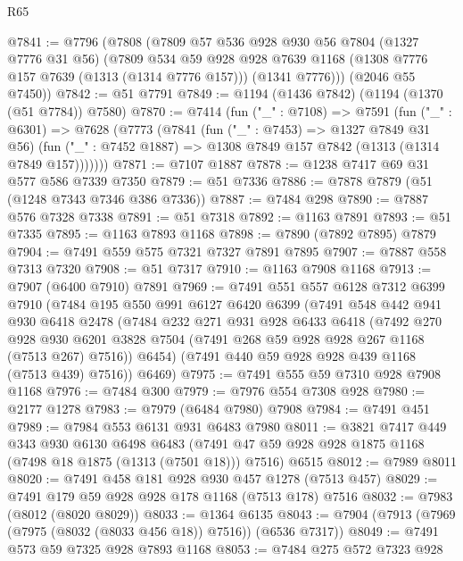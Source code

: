 \begin{lexlean}{R65}
\begin{coremodule}
@7841 := @7796
    (@7808
      (@7809
        @57
        @536
        @928
        @930
        @56
        @7804
        (@1327 @7776 @31 @56)
        (@7809
          @534
          @59
          @928
          @928
          @7639
          @1168
          (@1308 @7776 @157 @7639 (@1313 (@1314 @7776 @157)))
          (@1341 @7776)))
      (@2046 @55 @7450))
@7842 := @51 @7791
@7849 := @1194 (@1436 @7842) (@1194 (@1370 (@51 @7784)) @7580)
@7870 := @7414
    (fun ("_" : @7108) =>
    @7591
      (fun ("_" : @6301) =>
      @7628
        (@7773
          (@7841
            (fun ("_" : @7453) => @1327 @7849 @31 @56)
            (fun ("_" : @7452 @1887) => @1308 @7849 @157 @7842 (@1313 (@1314 @7849 @157)))))))
@7871 := @7107 @1887
@7878 := @1238 @7417 @69 @31 @577 @586 @7339 @7350
@7879 := @51 @7336
@7886 := @7878 @7879 (@51 (@1248 @7343 @7346 @386 @7336))
@7887 := @7484 @298
@7890 := @7887 @576 @7328 @7338
@7891 := @51 @7318
@7892 := @1163 @7891
@7893 := @51 @7335
@7895 := @1163 @7893 @1168
@7898 := @7890 (@7892 @7895) @7879
@7904 := @7491 @559 @575 @7321 @7327 @7891 @7895
@7907 := @7887 @558 @7313 @7320
@7908 := @51 @7317
@7910 := @1163 @7908 @1168
@7913 := @7907 (@6400 @7910) @7891
@7969 := @7491
    @551
    @557
    @6128
    @7312
    @6399
    @7910
    (@7484
      @195
      @550
      @991
      @6127
      @6420
      @6399
      (@7491
        @548
        @442
        @941
        @930
        @6418
        @2478
        (@7484
          @232
          @271
          @931
          @928
          @6433
          @6418
          (@7492
            @270
            @928
            @930
            @6201
            @3828
            @7504
            (@7491 @268 @59 @928 @928 @267 @1168 (@7513 @267) @7516))
          @6454)
        (@7491 @440 @59 @928 @928 @439 @1168 (@7513 @439) @7516))
      @6469)
@7975 := @7491 @555 @59 @7310 @928 @7908 @1168
@7976 := @7484 @300
@7979 := @7976 @554 @7308 @928
@7980 := @2177 @1278
@7983 := @7979 (@6484 @7980) @7908
@7984 := @7491 @451
@7989 := @7984 @553 @6131 @931 @6483 @7980
@8011 := @3821
    @7417
    @449
    @343
    @930
    @6130
    @6498
    @6483
    (@7491 @47 @59 @928 @928 @1875 @1168 (@7498 @18 @1875 (@1313 (@7501 @18))) @7516)
    @6515
@8012 := @7989 @8011
@8020 := @7491 @458 @181 @928 @930 @457 @1278 (@7513 @457)
@8029 := @7491 @179 @59 @928 @928 @178 @1168 (@7513 @178) @7516
@8032 := @7983 (@8012 (@8020 @8029))
@8033 := @1364 @6135
@8043 := @7904 (@7913 (@7969 (@7975 (@8032 (@8033 @456 @18)) @7516)) (@6536 @7317))
@8049 := @7491 @573 @59 @7325 @928 @7893 @1168
@8053 := @7484 @275 @572 @7323 @928

\end{coremodule}
\end{lexlean}
